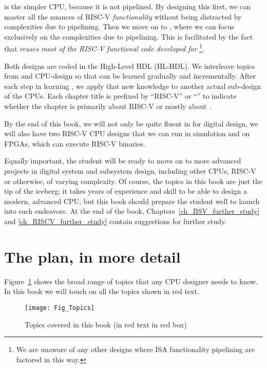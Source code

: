 {\DRUM} is the simpler CPU, because it is not pipelined.  By designing
this first, we can master all the nuances of RISC-V
\emph{functionality} without being distracted by complexities due to
pipelining.  Then we move on to {\FIFE}, where we can focus
exclusively on the complexities due to pipelining.  This is
facilitated by the fact that {\FIFE} \emph{reuses most of the RISC-V
functional code developed for} {\DRUM}\footnote{We are unaware of any
other designs where ISA functionality {\vs} pipelining are
factored in this way.}.

Both designs are coded in the {\BSV} High-Level HDL (HL-HDL).  We
interleave topics from {\BSV} and CPU-design so that {\BSV} can be learned
gradually and incrementally.  After each step in learning {\BSV}, we
apply that new knowledge to another actual sub-design of the CPUs.
Each chapter title is prefixed by ``RISC-V'' or ``{\BSV}'' to indicate
whether the chapter is primarily about RISC-V or mostly about {\BSV}.

By the end of this book, we will not only be quite fluent in {\BSV} for
digital design, we will also have two RISC-V CPU designs that we can
run in simulation and on FPGAs, {\ie} which can execute RISC-V
binaries.

Equally important, the student will be ready to move on to more
advanced projects in digital system and subsystem design, including
other CPUs, RISC-V or otherwise, of varying complexity.  Of course,
the topics in this book are just the tip of the iceberg; it takes
years of experience and skill to be able to design a modern, advanced
CPU, but this book should prepare the student well to launch into such
endeavors.  At the end of the book,
Chapters~\ref{ch_BSV_further_study} and \ref{ch_RISCV_further_study}
contain suggestions for further study.


\section{The plan, in more detail}

Figure~\ref{Fig_Topics} shows the broad range of topics that any CPU
designer needs to know.  In this book we will touch on all the
topics shown in red text.
\begin{figure}[htbp]
  \centerline{\texttt{[image: Fig\_Topics]}}
  \caption{\label{Fig_Topics}Topics covered in this book (in red text in red box)}
\end{figure}

